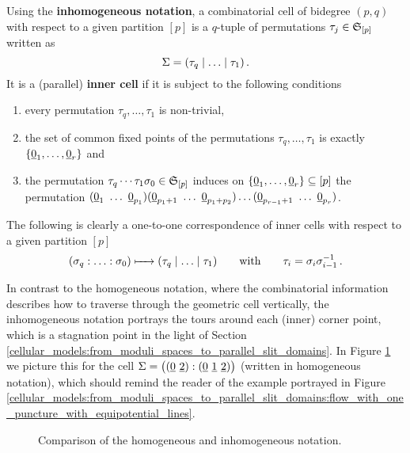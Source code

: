 \begin{defi}
    \label{cellular_models:parallel:inhomogeneous_notation}
    Using the {\bf inhomogeneous notation}, a combinatorial cell of bidegree $(p,q)$ with respect to a given partition $[p]$
    is a $q$-tuple of permutations $\tau_j \in \mathfrak S_{[p]}$ written as
    \[
        \Sigma = \inhomq \,.
    \]
    It is a (parallel) {\bf inner cell} if it is subject to the following conditions
    \begin{enumerate}
        \item every permutation $\tau_q, \ldots, \tau_1$ is non-trivial,
        \item the set of common fixed points of the permutations $\tau_q, \ldots, \tau_1$ is exactly $\{ \ul0_1, \ldots, \ul0_r\}$ and
        \item the permutation $\tau_q \cdots \tau_1 \sigma_0 \in \mathfrak S_{[p]}$ induces on $\{\ul0_1, \ldots, \ul0_r\} \subseteq [p]$ the permutation
            $(\ul0_1\ \ldots\ \ul0_{p_1})(\ul0_{p_1 + 1} \ \ldots\ \ul0_{p_1+p_2}) \ldots (\ul0_{p_{r-1} + 1} \ \ldots\ \ul0_{p_r})$.
    \end{enumerate}
\end{defi}
The following is clearly a one-to-one correspondence of inner cells with respect to a given partition $[p]$
\[
    \homogq \mapsto \inhomq \mspc{with}{20} \tau_i = \sigma_i\sigma_{i-1}^{-1} \,.
\]

In contrast to the homogeneous notation, where the combinatorial information describes how to traverse through the geometric cell vertically,
the inhomogeneous notation portrays the tours around each (inner) corner point, which is a stagnation point in the light of Section \ref{cellular_models:from_moduli_spaces_to_parallel_slit_domains}.
In Figure \ref{cellular_models:parallel:cell_comparison_notations} we picture this for the cell $\Sigma = \big( (\underline{\smash{0}}\ \underline{\smash{2}}): (\underline{\smash{0}}\ \underline{\smash{1}}\ \underline{\smash{2}}) \big)$ (written in homogeneous notation),
which should remind the reader of the example portrayed in Figure \ref{cellular_models:from_moduli_spaces_to_parallel_slit_domains:flow_with_one_puncture_with_equipotential_lines}.
\begin{figure}[ht]
\centering
{}
\caption{\label{cellular_models:parallel:cell_comparison_notations}Comparison of the homogeneous and inhomogeneous notation.}
\end{figure}

